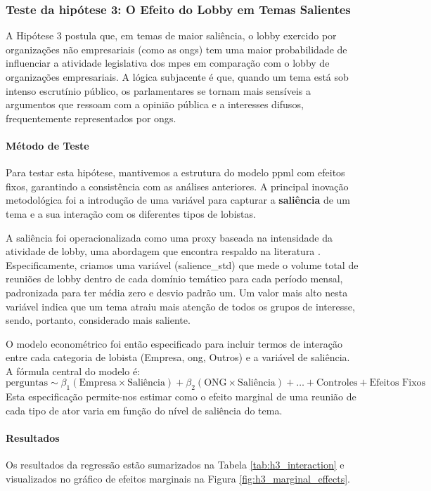 \subsubsection{Teste da hipótese 3: O Efeito do Lobby em Temas Salientes}

A Hipótese 3 postula que, em temas de maior saliência, o lobby exercido por organizações não empresariais (como as \acrshort{ong}s) tem uma maior probabilidade de influenciar a atividade legislativa dos \acrshort{mpe}s em comparação com o lobby de organizações empresariais. A lógica subjacente é que, quando um tema está sob intenso escrutínio público, os parlamentares se tornam mais sensíveis a argumentos que ressoam com a opinião pública e a interesses difusos, frequentemente representados por \acrshort{ong}s.

\paragraph{Método de Teste}
Para testar esta hipótese, mantivemos a estrutura do modelo \acrshort{ppml} com efeitos fixos, garantindo a consistência com as análises anteriores. A principal inovação metodológica foi a introdução de uma variável para capturar a \textbf{saliência} de um tema e a sua interação com os diferentes tipos de lobistas.

A saliência foi operacionalizada como uma proxy baseada na intensidade da atividade de lobby, uma abordagem que encontra respaldo na literatura \cite{baumgartner2010agendas}. Especificamente, criamos uma variável (salience\_std) que mede o volume total de reuniões de lobby dentro de cada domínio temático para cada período mensal, padronizada para ter média zero e desvio padrão um. Um valor mais alto nesta variável indica que um tema atraiu mais atenção de todos os grupos de interesse, sendo, portanto, considerado mais saliente.

O modelo econométrico foi então especificado para incluir termos de interação entre cada categoria de lobista (Empresa, \acrshort{ong}, Outros) e a variável de saliência. A fórmula central do modelo é:
\[ \text{perguntas} \sim \beta_1(\text{Empresa} \times \text{Saliência}) + \beta_2(\text{ONG} \times \text{Saliência}) + \dots + \text{Controles} + \text{Efeitos Fixos} \]
Esta especificação permite-nos estimar como o efeito marginal de uma reunião de cada tipo de ator varia em função do nível de saliência do tema.


\paragraph{Resultados}
Os resultados da regressão estão sumarizados na Tabela \ref{tab:h3_interaction} e visualizados no gráfico de efeitos marginais na Figura \ref{fig:h3_marginal_effects}.

